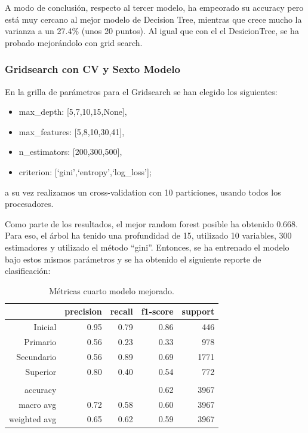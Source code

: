 \documentclass[a4paper]{article}
\begin{document}
            A modo de conclusión, respecto al tercer modelo, ha empeorado su accuracy pero está muy cercano al mejor modelo de Decision Tree, mientras que crece mucho la varianza a un 27.4\% (unos 20 puntos). 
            Al igual que con el el DesicionTree, se ha probado mejorándolo con grid search.

        \subsubsection{Gridsearch con CV y Sexto Modelo}

            En la grilla de parámetros para el Gridsearch se han elegido los siguientes:
            \begin{itemize}
                \item max\_depth: [5,7,10,15,None],
                \item max\_features: [5,8,10,30,41],
                \item n\_estimators: [200,300,500],
                \item criterion: [`gini',`entropy',`log\_loss'];
            \end{itemize}
            a su vez realizamos un cross-validation con 10 particiones, usando todos los procesadores.

           Como parte de los resultados, el mejor random forest posible ha obtenido 0.668. Para eso, el árbol ha tenido una profundidad de 15, utilizado  10  variables,  300  estimadores y utilizado el método ``gini''. Entonces, se ha entrenado el modelo bajo estos mismos parámetros y se ha obtenido el siguiente reporte de clasificación:

            \begin{table}[!ht]
                \centering
                \begin{tabular}{rrrrr}
                    \toprule
                    ~ & precision & recall & f1-score & support \\ \midrule
                    Inicial    & 0.95 & 0.79 & 0.86 & 446 \\
                    Primario   & 0.56 & 0.23 & 0.33 & 978 \\
                    Secundario & 0.56 & 0.89 & 0.69 & 1771 \\
                    Superior   & 0.80 & 0.40 & 0.54 & 772 \\
                    & & & & \\
                    accuracy & & & 0.62 & 3967 \\
                    macro avg & 0.72 & 0.58 & 0.60 & 3967 \\
                    weighted avg & 0.65 & 0.62 & 0.59 & 3967 \\
                    \bottomrule
                \end{tabular}
                \caption{Métricas cuarto modelo mejorado.}
                \label{New fourth model metrics}
            \end{table}
            
\end{document}
